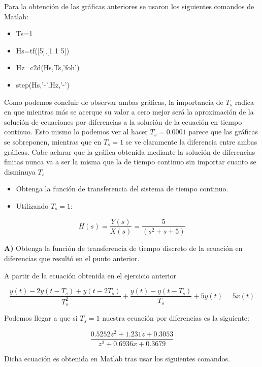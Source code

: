Para la obtención de las gráficas anteriores se usaron los siguientes comandos de Matlab:

\begin{itemize}
\item Ts=1
\item Hs=tf([5],[1 1 5])
\item Hz=c2d(Hs,Ts,'foh')
\item step(Hs,'-',Hz,'-')
\end{itemize}


Como podemos concluir de observar ambas gráficas, la importancia de $T_s$ radica en que mientras más se acerque su valor a cero mejor será la aproximación de la solución de ecuaciones por diferencias a la solución de la ecuación en tiempo continuo. Esto mismo lo podemos ver al hacer $T_s=0.0001$ parece que las gráficas se sobreponen, mientras que en $T_s=1$ se ve claramente la diferencia entre ambas gráficas. Cabe aclarar que la gráfica obtenida mediante la solución de diferencias finitas nunca va a ser la misma que la de tiempo continuo sin importar cuanto se disminuya $T_s$

\begin{itemize}
	\item Obtenga la función de transferencia del sistema de tiempo continuo.
	\item Utilizando $ T_s = 1 $:
\end{itemize}

\begin{equation}
	H(s)=\frac{Y(s)}{X(s)}=\frac{5}{(s^2+s+5)}
\end{equation}


\textbf{A)} Obtenga la función de transferencia de tiempo discreto de la ecuación en diferencias que resultó en	el punto anterior.

A partir de la ecuación obtenida en el ejercicio anterior

\begin{equation}
\frac{y(t)-2y(t-T_s)+y(t-2T_s)}{T_s^2}+\frac{y(t)-y(t-T_s)}{T_s}+5y(t)=5x(t)
\end{equation}

Podemos llegar a que si $T_s=1$ nuestra ecuación por diferencias es la siguiente:



\begin{equation}
\frac{0.5252z^2+1.231z+0.3053}{z^2 +0.6936x + 0.3679}
\end{equation}

Dicha ecuación es obtenida en Matlab tras usar los siguientes comandos.

